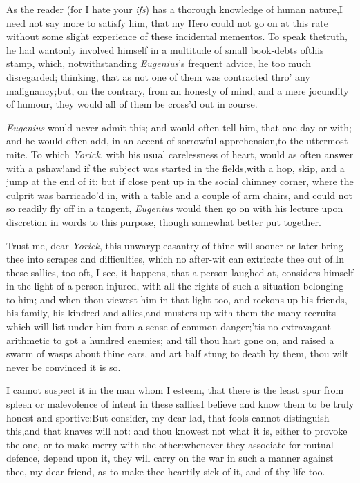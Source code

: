 \documentclass{article}
\begin{document}
As the reader (for I hate your \textit{ifs}) has a thorough
knowledge of human nature,\break I need not say more to satisfy him, that my
Hero could not go on at this rate without some
slight experience of these incidental mementos. To speak the\break truth,
he had wantonly involved himself in a multitude of small book-debts
of\break this stamp, which, notwithstanding \textit{Eu\-genius}’s
frequent advice, he too much disregarded; thinking, that as not one
of them was contracted thro’ any malignancy;\tsk  but, on
the contrary, from an honesty of mind, and a mere jocundity of
humour, they would all of them be cross’d out in course.

\textit{Eugenius} would never admit this; and would often tell
him, that one day or 
with; and he would often add, in an accent of sorrowful apprehension,\tsk  to the
uttermost mite. To which \textit{Yorick}, with his usual carelessness of heart,
would as often answer with a pshaw!\tsk  and if the subject was started in the
fields,\tsk  with a hop, skip, and a jump at the end of it; but if close pent up in
the social chimney corner, where the culprit was barri\-ca\-do’d in, with a table
and a couple of arm chairs, and could not so readily fly off in a tangent,\tsk
\textit{Eugenius} would then go on with his lecture upon discretion in words to
this purpose, though somewhat better put together.

Trust me, dear \textit{Yorick}, this unwary\break pleasantry of thine
will sooner or later bring thee into scrapes and difficulties,
which no after-wit can extricate thee out of.\tsh  In these
sallies, too oft, I see, it happens, that a person laughed at,
considers himself in the light of a person injured, with all the
rights of such a situation belonging to him; and when thou viewest
him in that light too, and rec\-kons up his friends, his family, his
kindred and allies,\tsk  and musters up with them the many
recruits which will list under him from a sense of common
danger;\tsk  ’tis no extravagant arithmetic to
got a hundred enemies; and till
thou hast gone on, and raised a swarm of wasps about thine ears,
and art half stung to death by them, thou wilt never be
convinced it is so.

I cannot suspect it in the man whom I esteem, that there is the
least spur from spleen or malevolence of intent in these
sallies\tsk  I believe and know them to be truly honest and
sportive:\tsk  But consider, my dear lad, that fools cannot
distinguish this,\tsk  and that knaves will not: and thou knowest
not what it is, either to provoke the one, or to make merry with
the other:\tsh  whenever they associate for mutual defence,
depend upon it, they will carry on the war in such a manner against
thee, my dear friend, as to make thee heartily sick of it, and of
thy life too.
\end{document}
